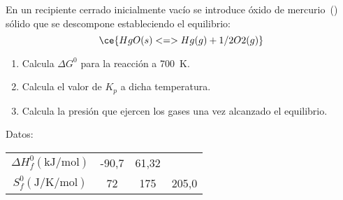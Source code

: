 En un recipiente cerrado inicialmente vacío se introduce óxido de mercurio~() sólido que se descompone estableciendo el equilibrio:
$$
	\ce{HgO(s) <=> Hg(g) + 1/2 O2(g)}
$$
\begin{enumerate}[label={\alph*)},font=\bfseries]
	\item Calcula $\Delta G^0$ para la reacción a \SI{700}{\kelvin}.
	\item Calcula el valor de $K_p$ a dicha temperatura.
	\item Calcula la presión que ejercen los gases una vez alcanzado el equilibrio.
\end{enumerate}
Datos:
\begin{center}
	\begin{tabular}{cSSS}
		\toprule
		& {} & {} 	& {}	\\
		\midrule
		$\Delta H^0_f(\si{\kilo\joule\per\mol})$	& 	-90,7		&	61,32		&				\\
		$S^0_f(\si{\joule\per\kelvin\per\mol})$		&	 72			&  175			& 	205,0		\\
		\bottomrule
	\end{tabular}
\end{center}
